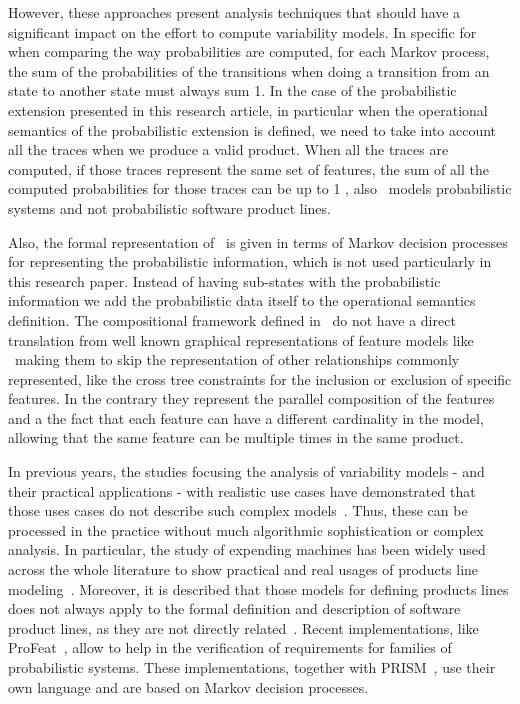 However, these approaches present analysis techniques that should have a significant impact on the effort to compute variability models. In specific for~\cite{vk13} when comparing the way probabilities are computed, for each Markov process, the sum of the probabilities of the transitions when doing a transition from an state to another state must always sum 1.
%
In the case of the probabilistic extension presented in this research article, in particular when the operational semantics of the probabilistic extension is defined, we need to take into account all the traces when we produce a valid product.  When all the traces are computed, if those traces represent the same set of features, the sum of all the computed probabilities for those traces can be up to 1
, also~\cite{vk13} models probabilistic systems and not probabilistic software product lines.

Also, the formal representation of~\cite{Dubslaff2015} is given in terms of Markov decision processes for
representing the probabilistic information, which is not used particularly in this research paper.  Instead of having sub-states with the probabilistic information we add the probabilistic data itself to the operational semantics definition.
%
The compositional framework defined in~\cite{Dubslaff2015} do not have a direct translation from well known graphical representations of feature models like \FODA\ making them to skip the representation of other relationships commonly represented, like the cross tree constraints for the inclusion or exclusion of specific features.
%
In the contrary they represent the parallel composition of the features and a the fact that each feature can have a different cardinality in the model, allowing that the same feature can be multiple times in the same product.



In previous years, the studies focusing the analysis of variability models  - and
their practical applications - with realistic use cases 
have demonstrated that those uses cases do not describe such complex models~\cite{jhf11, jhfes12}. Thus, these
can be processed in the practice without much algorithmic sophistication or
complex analysis.
In particular, the study of expending machines
has been widely used across the whole
literature to show practical and real usages of products
line modeling~\cite{jhfes12}. Moreover, it is described that those models for defining products
lines does not always apply to the
formal definition and description of software
product lines, as they are not directly related~\cite{cds06, fub06, nnz14}.
Recent implementations, like ProFeat~\cite{Chrszon2018}, allow to 
help in the verification of requirements for families of probabilistic systems. These implementations,  
together with PRISM~\cite{mgd12}, use their own language and are based on Markov decision processes.





